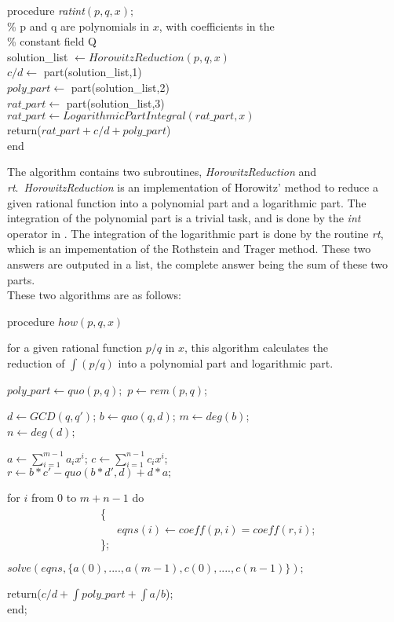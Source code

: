 \begin{flushleft}
procedure \textit{ratint}$(p,q,x);$ \\
\% p and q are polynomials in $x$, with coefficients in the \\
\% constant field Q \\
solution\_list $\leftarrow HorowitzReduction(p,q,x)$ \\
$c/d \leftarrow$ part(solution\_list,1) \\
$poly\_part \leftarrow$ part(solution\_list,2) \\
$rat\_part \leftarrow$ part(solution\_list,3) \\
$rat\_part \leftarrow LogarithmicPartIntegral(rat\_part,x)$ \\
return($rat\_part+c/d+poly\_part$) \\
end
\end{flushleft}

The algorithm contains two subroutines, \emph{HorowitzReduction} and \emph{rt}.\ \emph{HorowitzReduction} is an implementation of Horowitz' method to reduce a given rational function into a polynomial part and a logarithmic part. The integration of the polynomial part is a trivial task, and is done by the \emph{int} operator in \REDUCE. The integration of the logarithmic part is done by the routine \emph{rt}, which is an impementation of the Rothstein and Trager method. These two answers are outputed in a list, the complete answer being the sum of these two parts.
\\
These two algorithms are as follows:

\begin{flushleft}
procedure $how(p,q,x)$

for a given rational function $p/q$ in $x$, this algorithm calculates the \\
reduction of $\int(p/q)$ into a polynomial part and logarithmic part.

$poly\_part \leftarrow quo(p,q);$ \hspace{3mm} $p \leftarrow rem(p,q)$;

$d \leftarrow GCD(q,q')$; \hspace{3mm} $b \leftarrow quo(q,d)$; \hspace{3mm}
$m \leftarrow deg(b)$; \\
$n \leftarrow deg(d)$;

$a \leftarrow \sum_{i=1}^{m-1} a_{i}x^{i}$; \hspace{3mm}
   $c \leftarrow \sum_{i=1}^{n-1} c_{i}x^{i}$; \\

$r \leftarrow b*c'-quo(b*d',d)+d*a;$

for $i$ from $0$ to $m+n-1$ do \\
~~~~~~~~~~~~~~~~~\{ \\
~~~~~~~~~~~~~~~~~~~~$eqns(i) \leftarrow coeff(p,i)=coeff(r,i)$; \\
~~~~~~~~~~~~~~~~~\};

$solve(eqns,\{a(0),....,a(m-1),c(0),....,c(n-1)\});$

return($c/d+\int poly\_part + \int a/b$); \\
end;
\end{flushleft}

